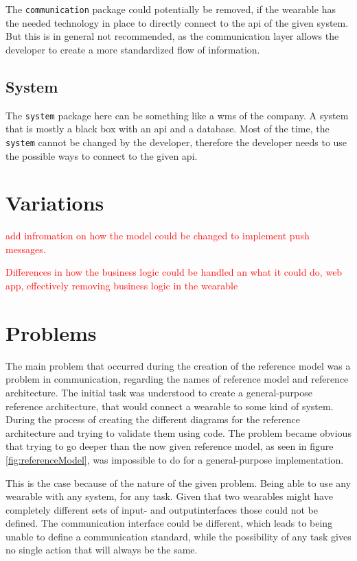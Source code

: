 The \texttt{communication} package could potentially be removed, if the wearable has the needed technology in place to directly connect to the \gls{api} of the given system. But this is in general not recommended, as the communication layer allows the developer to create a more standardized flow of information.

\subsection{System}
The \texttt{system} package here can be something like a \gls{wms} of the company. A system that is mostly a black box with an \gls{api} and a database. Most of the time, the \texttt{system} cannot be changed by the developer, therefore the developer needs to use the possible ways to connect to the given \gls{api}.

\section{Variations}

\textcolor{red}{add infromation on how the model could be changed to implement push messages.
}

\textcolor{red}{Differences in how the business logic could be handled  an what it could do, web app, effectively removing business logic in the wearable}

\section{Problems}
The main problem that occurred during the creation of the \gls{reference model} was a problem in communication, regarding the names of \gls{reference model} and \gls{reference architecture}. The initial task was understood to create a general-purpose \gls{reference architecture}, that would connect a \gls{wearable} to some kind of system. During the process of creating the different diagrams for the reference architecture and trying to validate them using code. The problem became obvious that trying to go deeper than the now given \gls{reference model}, as seen in figure \ref{fig:referenceModel}, was impossible to do for a general-purpose implementation.

This is the case because of the nature of the given problem. Being able to use any wearable with any system, for any task. Given that two wearables might have completely different sets of input- and outputinterfaces those could not be defined. The communication interface could be different, which leads to being unable to define a communication standard, while the possibility of any task gives no single action that will always be the same.
